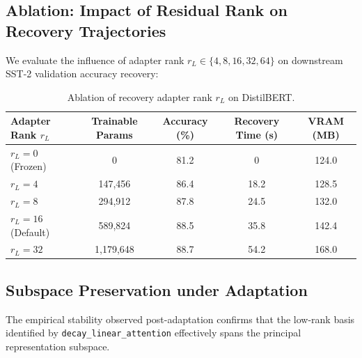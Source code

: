 \subsection{Ablation: Impact of Residual Rank on Recovery Trajectories}
We evaluate the influence of adapter rank $r_L \in \{4, 8, 16, 32, 64\}$ on downstream SST-2 validation accuracy recovery:
\begin{table}[H]
\centering
\small
\begin{tabularx}{\linewidth}{lcccc}
\toprule
\textbf{Adapter Rank $r_L$} & \textbf{Trainable Params} & \textbf{Accuracy (\%)} & \textbf{Recovery Time (s)} & \textbf{VRAM (MB)} \\
\midrule
$r_L = 0$ (Frozen) & 0 & 81.2 & 0 & 124.0 \\
$r_L = 4$ & 147,456 & 86.4 & 18.2 & 128.5 \\
$r_L = 8$ & 294,912 & 87.8 & 24.5 & 132.0 \\
$r_L = 16$ (Default) & 589,824 & 88.5 & 35.8 & 142.4 \\
$r_L = 32$ & 1,179,648 & 88.7 & 54.2 & 168.0 \\
\bottomrule
\end{tabularx}
\caption{Ablation of recovery adapter rank $r_L$ on DistilBERT.}
\label{tab:ablation\_adapter\_rank}
\end{table}

\subsection{Subspace Preservation under Adaptation}
The empirical stability observed post-adaptation confirms that the low-rank basis identified by \texttt{decay\_linear\_attention} effectively spans the principal representation subspace.
